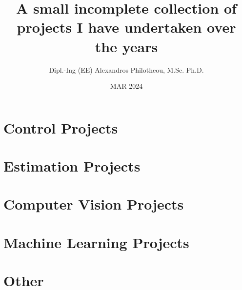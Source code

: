 






  \title{\Huge A small incomplete collection of projects I have undertaken over the years}
  \author{Dipl.-Ing (EE) Alexandros Philotheou, M.Sc. Ph.D.}
  \date{MAR 2024}
  \maketitle
  \vspace{2cm}

  \tableofcontents
  \thispagestyle{empty}
  \clearpage

  \section{Control Projects}
    
    
    
    
    \newpage

  \section{Estimation Projects}
    
    \newpage

  \section{Computer Vision Projects}
    
    \newpage

  \section{Machine Learning Projects}
    

  \section{Other}
    

  \cleardoublepage
\printbibliography[heading=none,notcategory=nobibliography]


